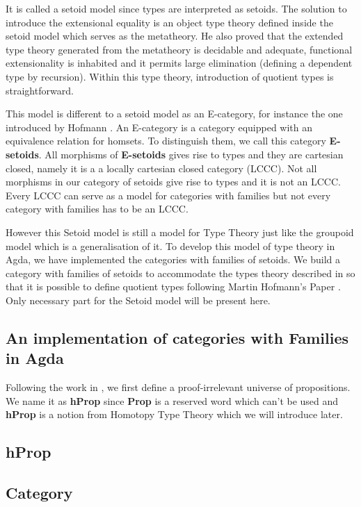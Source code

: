  It is called a setoid model since types are interpreted as setoids.
The solution to introduce the extensional equality is an object type theory defined inside the setoid model which serves as the metatheory. He also proved that the extended type theory generated from the metatheory is decidable and adequate, functional extensionality is
inhabited and it permits large elimination (defining a dependent type by recursion). Within this type theory,
introduction of quotient types is straightforward.

This model is different to a setoid model as an E-category, for instance
the one introduced by Hofmann \cite{hofmann1995interpretation} . An E-category is a category equipped with
an equivalence relation for homsets. To distinguish them, we call this
category \textbf{E-setoids}.  All morphisms of \textbf{E-setoids}
gives rise to types and they are cartesian closed, namely it is a a locally
cartesian closed category (LCCC). Not all morphisms in our category of setoids give
rise to types and it is not an LCCC. Every LCCC can serve as a model for categories with
families but not every category with families has to be an
LCCC. 

However this Setoid model is still a model for Type
Theory just like the groupoid model which is a generalisation of it.
To develop this model of type theory in Agda, we have implemented the
categories with families of setoids. 
We build a category with families of setoids to accommodate the types theory described in
\cite{alti:lics99}  so that it is possible to define quotient types
following Martin Hofmann's Paper \cite{hof:95:sm}.  Only necessary
part for the Setoid model will be present here.


\subsection{An implementation of categories with Families in Agda}

Following the work in \cite{alti:99}, we first define a
proof-irrelevant universe of propositions. We name it as \textbf{hProp}
since \textbf{Prop} is a  reserved word which can't be used and
\textbf{hProp} is a notion from Homotopy Type Theory which we will introduce later.

\subsection{hProp}


\subsection{Category}

